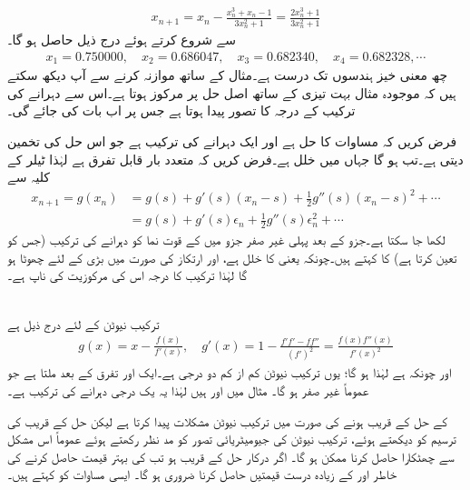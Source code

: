 \begin{align*}
x_{n+1}=x_n-\frac{x_n^3+x_n-1}{3x_n^2+1}=\frac{2x_n^3+1}{3x_n^2+1}
\end{align*}
 سے شروع کرتے ہوئے درج ذیل حاصل ہو گا۔
\begin{align*}
x_1=\num{0.750000},\quad x_2=\num{0.686047},\quad x_3=\num{0.682340},\quad x_4=\num{0.682328},\cdots
\end{align*}
 چھ معنی خیز ہندسوں تک درست ہے۔مثال  کے ساتھ موازنہ کرنے سے آپ دیکھ سکتے ہیں کہ موجودہ مثال بہت تیزی کے ساتھ اصل حل پر مرکوز ہوتا ہے۔اس سے دہرانے کی ترکیب کے درجہ کا تصور پیدا ہوتا ہے جس پر اب بات کی جائے گی۔

فرض کریں کہ مساوات  کا حل  ہے اور   ایک دہرانے کی ترکیب ہے جو اس حل کی تخمین  دیتی ہے۔تب  ہو گا جہاں  میں خلل  ہے۔فرض کریں کہ  متعدد بار قابل تفرق ہے لہٰذا ٹیلر کے کلیہ سے 
\begin{align*}
x_{n+1}=g(x_n)&=g(s)+g'(s)(x_n-s)+\frac{1}{2}g''(s)(x_n-s)^2+\cdots\\
&=g(s)+g'(s)\epsilon_n+\frac{1}{2}g''(s)\epsilon_n^2+\cdots
\end{align*}
لکھا  جا سکتا ہے۔جزو  کے بعد پہلی غیر صفر جزو میں  کے قوت نما کو دہرانے کی ترکیب (جس کو  تعین کرتا ہے) کا  کہتے ہیں۔چونکہ  یعنی  کا خلل ہے، اور ارتکاز کی صورت میں بڑی  کے لئے  چھوٹا ہو گا لہٰذا ترکیب کا درجہ اس کی مرکوزیت کی ناپ ہے۔

\\
ترکیب نیوٹن کے لئے درج ذیل ہے
\begin{align*} 
g(x)=x-\frac{f(x)}{f'(x)},\quad g'(x)=1-\frac{f'f'-ff''}{(f')^2}=\frac{f(x)f''(x)}{f'(x)^2}
\end{align*} 
اور چونکہ  ہے لہٰذا  ہو گا؛ یوں ترکیب نیوٹن کم از کم دو درجی ہے۔ایک اور تفرق کے بعد  ملتا ہے جو عموماً غیر صفر ہو گا۔ مثال  میں  اور  ہیں لہٰذا یہ یک درجی دہرانے کی ترکیب ہے۔

 کے حل کے قریب  ہونے کی صورت میں ترکیب نیوٹن مشکلات پیدا کرتا ہے لیکن حل کے قریب  کی ترسیم  کو دیکھتے ہوئے، ترکیب نیوٹن کی جیومیٹریائی تصور کو مد نظر رکھتے ہوئے عموماً  اس مشکل سے چھٹکارا حاصل کرنا ممکن ہو گا۔ اگر درکار حل کے قریب  ہو تب  کی بہتر قیمت حاصل کرنے کی خاطر   اور  کے زیادہ درست قیمتیں حاصل کرنا ضروری ہو گا۔ ایسی مساوات کو  کہتے ہیں۔

